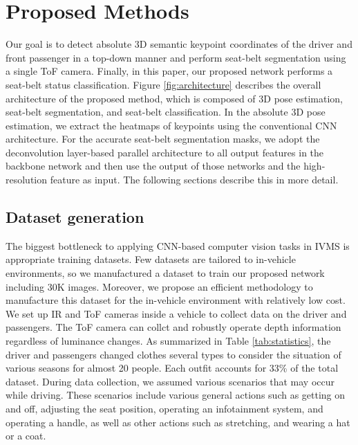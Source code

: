 \documentclass[letterpaper]{article} %
\begin{document}
\section{Proposed Methods}
Our goal is to detect absolute 3D semantic keypoint coordinates of the driver and front passenger in a top-down manner and perform seat-belt segmentation using a single ToF camera. Finally, in this paper, our proposed network performs a seat-belt status classification. Figure \ref{fig:architecture} describes the overall architecture of the proposed method, which is composed of 3D pose estimation, seat-belt segmentation, and seat-belt classification. In the absolute 3D pose estimation, we extract the heatmaps of keypoints using the conventional CNN architecture. For the accurate seat-belt segmentation masks, we adopt the deconvolution layer-based parallel architecture to all output features in the backbone network and then use the output of those networks and the high-resolution feature as input. The following sections describe this in more detail.

\begin{table}[t]
\centering
{}
\caption{Subject statistics.}
\label{tab:statistics}
\end{table}

\subsection{Dataset generation}
The biggest bottleneck to applying CNN-based computer vision tasks in IVMS is appropriate training datasets. Few datasets are tailored to in-vehicle environments, so we manufactured a dataset to train our proposed network including 30K images. Moreover, we propose an efficient methodology to manufacture this dataset for the in-vehicle environment with relatively low cost. We set up IR and ToF cameras inside a vehicle to collect data on the driver and passengers. The ToF camera can collct and robustly operate depth information regardless of luminance changes. As summarized in Table \ref{tab:statistics}, the driver and passengers changed clothes several types to consider the situation of various seasons for almost 20 people. Each outfit accounts for 33\% of the total dataset. During data collection, we assumed various scenarios that may occur while driving. These scenarios include various general actions such as getting on and off, adjusting the seat position, operating an infotainment system, and operating a handle, as well as other actions such as stretching, and wearing a hat or a coat.
\end{document}
